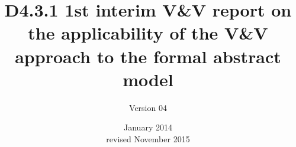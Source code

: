 \documentclass{template/openetcs_article}
\begin{document}
\frontmatter
{}




\title{D4.3.1 1st interim V\&V report on the applicability of the V\&V approach to the formal abstract model}

\subtitle{Version 04}

\date{January 2014\\revised November 2015 }

\creatorname{}                                                                                                                                
\creatoraffil{}                                                                                                                                                                                                                                                                                   
\techassessorname{}                                                                                                                       
\techassessoraffil{}                                                                                                                                                                                                                                                                        
\qualityassessorname{}                                                                                                                       
\qualityassessoraffil{}                                                                                                                      
                                                                                                                                                            
\end{document}
